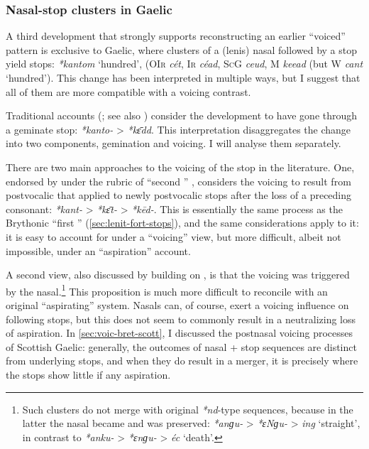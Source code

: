 \documentclass[output=paper,colorlinks,citecolor=brown]{langscibook}
\begin{document}
\subsubsection{Nasal-stop clusters in Gaelic}
\label{sec:nasal-stop-clusters}

A third development that strongly supports reconstructing an earlier \enquote{voiced} pattern is exclusive to Gaelic, where clusters of a (lenis) nasal followed by a  stop yield  stops: \textit{*kantom} `hundred', (\textsc{OIr} \textit{cét}, \textsc{Ir} \textit{céad}, \textsc{ScG} \textit{ceud}, M \textit{keead} (but W \textit{cant} `hundred'). This change has been interpreted in multiple ways, but I suggest that all of them are more compatible with a voicing contrast.

Traditional accounts (\cite{thurneysen,martinet1952celtic}; see also \cite{stifter2023celtic}) consider the development to have gone through a  geminate stop: \textit{*kanto-} > \textit{*kɛ̄dd}. This interpretation disaggregates the change into two components, gemination and voicing. I will analyse them separately.

There are two main approaches to the voicing of the stop in the literature. One, endorsed by \textcite{mccone} under the rubric of \enquote{second } \parencite[see also][]{kortlandt1982phonemicization}, considers the voicing to result from postvocalic  that applied to newly postvocalic  stops after the loss of a preceding consonant: \textit{*kant-} > \textit{*kɛ̄t-} > \textit{*kēd-}. This is essentially the same process as the Brythonic \enquote{first } (\cref{sec:lenit-fort-stops}), and the same considerations apply to it: it is easy to account for under a \enquote{voicing} view, but more difficult, albeit not impossible, under an \enquote{aspiration} account.

A second view, also discussed by \textcite[91]{mccone} building on \textcite{greene1960some}, is that the voicing was triggered by the nasal.\footnote{Such clusters do not merge with original \textit{*nd}-type sequences, because in the latter the nasal became  and was preserved: \textit{*anɡu-} > \textit{*ɛNɡu-} > \textit{ing} `straight', in contrast to \textit{*anku-} > \textit{*ɛnɡu-} > \textit{éc} `death'.} This proposition is much more difficult to reconcile with an original \enquote{aspirating} system. Nasals can, of course, exert a voicing influence on following stops, but this does not seem to commonly result in a neutralizing loss of aspiration. In \cref{sec:voic-bret-scott}, I discussed the postnasal voicing processes of Scottish Gaelic: generally, the outcomes of nasal +  stop sequences are distinct from underlying  stops, and when they do result in a merger, it is precisely where the  stops show little if any aspiration.
\end{document}

